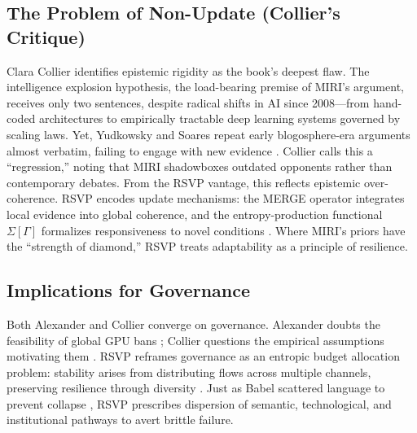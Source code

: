 \documentclass[12pt]{article}
\begin{document}
\subsection{The Problem of Non-Update (Collier’s Critique)}
Clara Collier \citep{collier2025reviewIABIED} identifies epistemic rigidity as the book’s deepest flaw. The intelligence explosion hypothesis, the load-bearing premise of MIRI’s argument, receives only two sentences, despite radical shifts in AI since 2008—from hand-coded architectures to empirically tractable deep learning systems governed by scaling laws. Yet, Yudkowsky and Soares repeat early blogosphere-era arguments almost verbatim, failing to engage with new evidence \citep{collier2025reviewIABIED}. Collier calls this a “regression,” noting that MIRI shadowboxes outdated opponents rather than contemporary debates. From the RSVP vantage, this reflects epistemic over-coherence. RSVP encodes update mechanisms: the MERGE operator integrates local evidence into global coherence, and the entropy-production functional $\Sigma[\Gamma]$ formalizes responsiveness to novel conditions \citep{verlinde2011entropic}. Where MIRI’s priors have the “strength of diamond,” RSVP treats adaptability as a principle of resilience.

\subsection{Implications for Governance}
Both Alexander and Collier converge on governance. Alexander doubts the feasibility of global GPU bans \citep{alexander2025reviewIABIED}; Collier questions the empirical assumptions motivating them \citep{collier2025reviewIABIED}. RSVP reframes governance as an entropic budget allocation problem: stability arises from distributing flows across multiple channels, preserving resilience through diversity \citep{landauer1961irreversibility}. Just as Babel scattered language to prevent collapse \citep{genesis11}, RSVP prescribes dispersion of semantic, technological, and institutional pathways to avert brittle failure.
\end{document}
